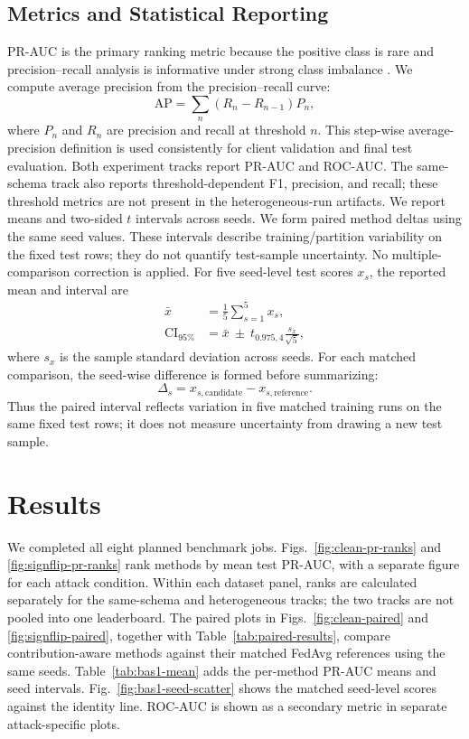 \documentclass{ieeeaccess}
\begin{document}
\subsection{Metrics and Statistical Reporting}
PR-AUC is the primary ranking metric because the positive class is rare and
precision--recall analysis is informative under strong class imbalance
\cite{saito2015}.
We compute average precision from the precision--recall curve:
\begin{equation}
  \mathrm{AP}=\sum_n(R_n-R_{n-1})P_n,
\end{equation}
where $P_n$ and $R_n$ are precision and recall at threshold $n$. This
step-wise average-precision definition is used consistently for client
validation and final test evaluation.
Both experiment tracks report PR-AUC and ROC-AUC. The same-schema track also
reports threshold-dependent F1, precision, and recall; these threshold metrics
are not present in the heterogeneous-run artifacts.
We report means and two-sided $t$ intervals across seeds. We form paired
method deltas using the same seed values. These intervals describe
training/partition variability on the fixed test rows; they do not quantify
test-sample uncertainty. No multiple-comparison correction is applied.
For five seed-level test scores $x_s$, the reported mean and interval are
\begin{align}
  \bar{x} &= \frac{1}{5}\sum_{s=1}^{5}x_s,\\
  \mathrm{CI}_{95\%} &=
  \bar{x}\ \pm\ t_{0.975,4}\frac{s_x}{\sqrt{5}},
\end{align}
where $s_x$ is the sample standard deviation across seeds. For each matched
comparison, the seed-wise difference is formed before summarizing:
\begin{equation}
  \Delta_s = x_{s,\mathrm{candidate}}-x_{s,\mathrm{reference}}.
\end{equation}
Thus the paired interval reflects variation in five matched training runs on
the same fixed test rows; it does not measure uncertainty from drawing a new
test sample.

\section{Results}
We completed all eight planned benchmark jobs. Figs.~\ref{fig:clean-pr-ranks}
and \ref{fig:signflip-pr-ranks} rank methods by mean test PR-AUC, with a
separate figure for each attack condition. Within each dataset panel, ranks
are calculated separately for the same-schema and heterogeneous tracks; the
two tracks are not pooled into one leaderboard. The paired plots in
Figs.~\ref{fig:clean-paired} and \ref{fig:signflip-paired}, together with
Table~\ref{tab:paired-results}, compare contribution-aware methods against
their matched FedAvg references using the same seeds. Table~\ref{tab:bas1-mean}
adds the per-method PR-AUC means and seed intervals. Fig.~\ref{fig:bas1-seed-scatter}
shows the matched seed-level scores against the identity line. ROC-AUC is shown
as a secondary metric in separate attack-specific plots.
\end{document}

